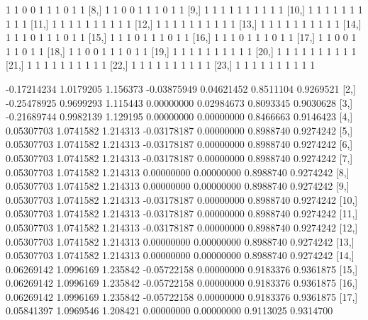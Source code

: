 \documentclass[a4paper]{article}
\begin{document}
\begin{Schunk}
\begin{Soutput}
 [7,]    1    1    0    0    1    1    1    0    1     1
 [8,]    1    1    0    0    1    1    1    0    1     1
 [9,]    1    1    1    1    1    1    1    1    1     1
[10,]    1    1    1    1    1    1    1    1    1     1
[11,]    1    1    1    1    1    1    1    1    1     1
[12,]    1    1    1    1    1    1    1    1    1     1
[13,]    1    1    1    1    1    1    1    1    1     1
[14,]    1    1    1    0    1    1    1    0    1     1
[15,]    1    1    1    0    1    1    1    0    1     1
[16,]    1    1    1    0    1    1    1    0    1     1
[17,]    1    1    0    0    1    1    1    0    1     1
[18,]    1    1    0    0    1    1    1    0    1     1
[19,]    1    1    1    1    1    1    1    1    1     1
[20,]    1    1    1    1    1    1    1    1    1     1
[21,]    1    1    1    1    1    1    1    1    1     1
[22,]    1    1    1    1    1    1    1    1    1     1
[23,]    1    1    1    1    1    1    1    1    1     1
\end{Soutput}
\begin{Soutput}
             [,1]      [,2]     [,3]        [,4]       [,5]      [,6]      [,7]
 [1,] -0.17214234 1.0179205 1.156373 -0.03875949 0.04621452 0.8511104 0.9269521
 [2,] -0.25478925 0.9699293 1.115443  0.00000000 0.02984673 0.8093345 0.9030628
 [3,] -0.21689744 0.9982139 1.129195  0.00000000 0.00000000 0.8466663 0.9146423
 [4,]  0.05307703 1.0741582 1.214313 -0.03178187 0.00000000 0.8988740 0.9274242
 [5,]  0.05307703 1.0741582 1.214313 -0.03178187 0.00000000 0.8988740 0.9274242
 [6,]  0.05307703 1.0741582 1.214313 -0.03178187 0.00000000 0.8988740 0.9274242
 [7,]  0.05307703 1.0741582 1.214313  0.00000000 0.00000000 0.8988740 0.9274242
 [8,]  0.05307703 1.0741582 1.214313  0.00000000 0.00000000 0.8988740 0.9274242
 [9,]  0.05307703 1.0741582 1.214313 -0.03178187 0.00000000 0.8988740 0.9274242
[10,]  0.05307703 1.0741582 1.214313 -0.03178187 0.00000000 0.8988740 0.9274242
[11,]  0.05307703 1.0741582 1.214313 -0.03178187 0.00000000 0.8988740 0.9274242
[12,]  0.05307703 1.0741582 1.214313  0.00000000 0.00000000 0.8988740 0.9274242
[13,]  0.05307703 1.0741582 1.214313  0.00000000 0.00000000 0.8988740 0.9274242
[14,]  0.06269142 1.0996169 1.235842 -0.05722158 0.00000000 0.9183376 0.9361875
[15,]  0.06269142 1.0996169 1.235842 -0.05722158 0.00000000 0.9183376 0.9361875
[16,]  0.06269142 1.0996169 1.235842 -0.05722158 0.00000000 0.9183376 0.9361875
[17,]  0.05841397 1.0969546 1.208421  0.00000000 0.00000000 0.9113025 0.9314700

\end{Soutput}
\end{Schunk}
\end{document}
